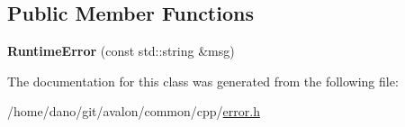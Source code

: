 \subsection*{Public Member Functions}
\begin{DoxyCompactItemize}
\item 
\mbox{\label{classtcf_1_1error_1_1RuntimeError_a0b0baeeda06950d38150491638526ffe}} 
{\bfseries Runtime\+Error} (const std\+::string \&msg)
\end{DoxyCompactItemize}


The documentation for this class was generated from the following file\+:\begin{DoxyCompactItemize}
\item 
/home/dano/git/avalon/common/cpp/\hyperlink{error_8h}{error.\+h}\end{DoxyCompactItemize}
